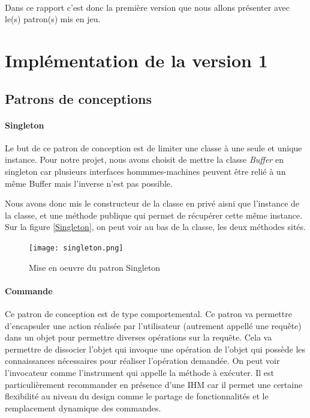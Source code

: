 \documentclass[a4paper,11pt]{article}
\begin{document}
\paragraph{}
Dans ce rapport c'est donc la première version que nous allons présenter avec le(s) patron(s) mis en jeu.



\section{Implémentation de la version 1}
\subsection{Patrons de conceptions}

\paragraph{Singleton}
Le but de ce patron de conception est de limiter une classe à une seule et unique instance. 
Pour notre projet, nous avons choisit de mettre la classe \textit{Buffer} en singleton car plusieurs interfaces hommmes-machines peuvent être relié à un même Buffer mais l'inverse n'est pas possible.

\pargraph{}
Nous avons donc mis le constructeur de la classe en privé aisni que l'instance de la classe, et une méthode publique qui permet de récupérer cette même instance. Sur la figure \ref{Singleton}, on peut voir au bas de la classe, les deux méthodes sités.


\begin{figure}[!ht]
		\center
		\texttt{[image: singleton.png]}
		\caption{Mise en oeuvre du patron Singleton}
		\label{singleton}
\end{figure}

\paragraph{Commande} Ce patron de conception est de type comportemental. Ce patron va permettre d'encapsuler une action réalisée par l'utilisateur (autrement appellé une requête)  dans un objet pour permettre diverses opérations sur la requête. Cela va permettre de dissocier l'objet qui invoque une opération de l'objet qui possède les connaissances nécessaires pour réaliser l'opération demandée. On peut voir l'invocateur comme l'instrument qui appelle la méthode à exécuter. Il est particulièrement recommander en présence d'une IHM car il permet une certaine flexibilité au niveau du design comme le partage de fonctionnalités et le remplacement dynamique des commandes.
\end{document}
